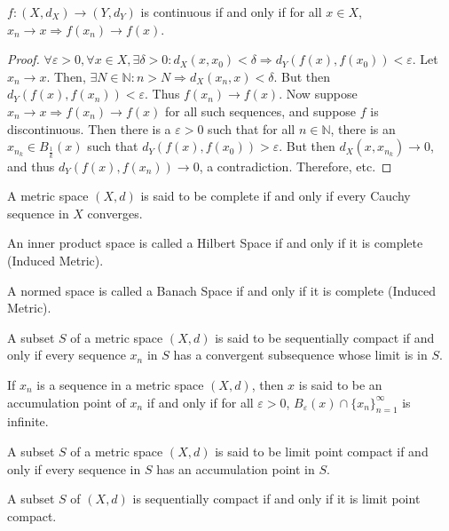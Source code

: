 \documentclass[crop=false,class=book]{standalone}
\begin{document}
\begin{theorem}
$f:(X,d_X)\rightarrow (Y,d_Y)$ is continuous if and only if for all $x\in X$, $x_n\rightarrow x \Rightarrow f(x_n)\rightarrow f(x)$.
\end{theorem}
\begin{proof}
$\forall \varepsilon>0,\forall x\in X,\exists \delta>0:d_X(x,x_0)<\delta \Rightarrow d_Y(f(x),f(x_0))<\varepsilon$. Let $x_n \rightarrow x$. Then, $\exists N\in \mathbb{N}:n>N \Rightarrow d_X(x_n,x)<\delta$. But then $d_Y(f(x),f(x_n)) < \varepsilon$. Thus $f(x_n)\rightarrow f(x)$. Now suppose $x_n\rightarrow x \Rightarrow f(x_n)\rightarrow f(x)$ for all such sequences, and suppose $f$ is discontinuous. Then there is a $\varepsilon>0$ such that for all $n\in \mathbb{N}$, there is an $x_{n_k} \in B_{\frac{1}{k}}(x)$ such that $d_Y(f(x),f(x_0))>\varepsilon$. But then $d_X(x,x_{n_k})\rightarrow 0$, and thus $d_Y(f(x),f(x_n))\rightarrow 0$, a contradiction. Therefore, etc.
\end{proof}
\begin{definition}
A metric space $(X,d)$ is said to be complete if and only if every Cauchy sequence in $X$ converges.
\end{definition}
\begin{definition}
An inner product space is called a Hilbert Space if and only if it is complete (Induced Metric).
\end{definition}
\begin{definition}
A normed space is called a Banach Space if and only if it is complete (Induced Metric).
\end{definition}
\begin{definition}
A subset $S$ of a metric space $(X,d)$ is said to be sequentially compact if and only if every sequence $x_n$ in $S$ has a convergent subsequence whose limit is in $S$.
\end{definition}
\begin{definition}
If $x_n$ is a sequence in a metric space $(X,d)$, then $x$ is said to be an accumulation point of $x_n$ if and only if for all $\varepsilon>0$, $B_{\varepsilon}(x)\cap \{x_n\}_{n=1}^{\infty}$ is infinite.
\end{definition}
\begin{definition}
A subset $S$ of a metric space $(X,d)$ is said to be limit point compact if and only if every sequence in $S$ has an accumulation point in $S$.
\end{definition}
\begin{theorem}
A subset $S$ of $(X,d)$ is sequentially compact if and only if it is limit point compact.
\end{theorem}
\end{document}
